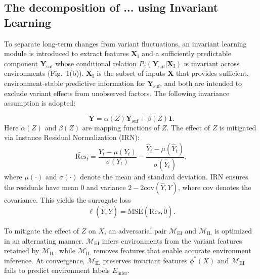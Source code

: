 ﻿\documentclass[journal]{IEEEtran}
\begin{document}
\subsection{The decomposition of ... using Invariant Learning}
To separate long-term changes from variant fluctuations, an invariant learning module is introduced to extract features $\mathbf{X}_{\mathrm{I}}$ and a sufficiently predictable component $\mathbf{Y}_{\mathrm{suf}}$ whose conditional relation $P_e(\mathbf{Y}_{\mathrm{suf}}|\mathbf{X}_{\mathrm{I}})$ is invariant across environments (Fig.~1(b)). $\mathbf{X}_{\mathrm{I}}$ is the subset of inputs $\mathbf{X}$ that provides sufficient, environment-stable predictive information for $\mathbf{Y}_{\mathrm{suf}}$, and both are intended to exclude variant effects from unobserved factors. The following invariance assumption is adopted:

\begin{equation}
\mathbf{Y}=\alpha(Z)\mathbf{Y}_{\mathrm{suf}}+\beta(Z) \mathbf{1}.
\end{equation}
Here $\alpha(Z)$ and $\beta(Z)$ are mapping functions of $Z$. The effect of $Z$ is mitigated via Instance Residual Normalization (IRN):
\begin{equation}
\tilde{\mathrm{Res}}_t=\frac{Y_t-\mu(Y_t)}{\sigma(Y_t)}-\frac{\widehat{Y}_t-\mu(\widehat{Y}_t)}{\sigma(\widehat{Y}_t)},
\end{equation}
where $\mu(\cdot)$ and $\sigma(\cdot)$ denote the mean and standard deviation. IRN ensures the residuals have mean 0 and variance $2-2\mathrm{cov}(\widehat{Y},Y)$, where $\mathrm{cov}$ denotes the covariance. This yields the surrogate loss
\begin{equation}
\ell(\widehat{Y},Y)=\mathrm{MSE}(\tilde{\mathrm{Res}},0).
\end{equation}

To mitigate the effect of $Z$ on $X$, an adversarial pair $\mathcal{M}_{\mathrm{EI}}$ and $\mathcal{M}_{\mathrm{IL}}$ is optimized in an alternating manner. $\mathcal{M}_{\mathrm{EI}}$ infers environments from the variant features retained by $\mathcal{M}_{\mathrm{IL}}$, while $\mathcal{M}_{\mathrm{IL}}$ removes features that enable accurate environment inference. At convergence, $\mathcal{M}_{\mathrm{IL}}$ preserves invariant features $\phi^{*}(X)$ and $\mathcal{M}_{\mathrm{EI}}$ fails to predict environment labels $E_{\mathrm{infer}}$. 
\end{document}
